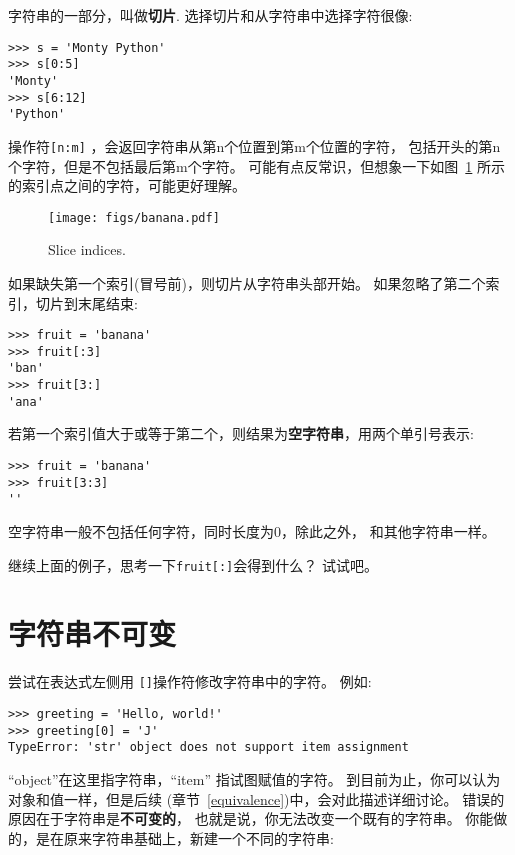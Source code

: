 \documentclass[10pt]{book}
\begin{document}
字符串的一部分，叫做{\bf 切片}.
选择切片和从字符串中选择字符很像:

\begin{verbatim}
>>> s = 'Monty Python'
>>> s[0:5]
'Monty'
>>> s[6:12]
'Python'
\end{verbatim}
%
操作符{\tt [n:m]} ，会返回字符串从第n个位置到第m个位置的字符，
包括开头的第n个字符，但是不包括最后第m个字符。
可能有点反常识，但想象一下如图~\ref{fig.banana} 所示
的索引点之间的字符，可能更好理解。

\begin{figure}
\centerline
{\texttt{[image: figs/banana.pdf]}}
\caption{Slice indices.}
\label{fig.banana}
\end{figure}
如果缺失第一个索引(冒号前)，则切片从字符串头部开始。
如果忽略了第二个索引，切片到末尾结束:

\begin{verbatim}
>>> fruit = 'banana'
>>> fruit[:3]
'ban'
>>> fruit[3:]
'ana'
\end{verbatim}
%
若第一个索引值大于或等于第二个，则结果为{\bf 空字符串}，用两个单引号表示:

\begin{verbatim}
>>> fruit = 'banana'
>>> fruit[3:3]
''
\end{verbatim}
%
空字符串一般不包括任何字符，同时长度为0，除此之外，
和其他字符串一样。

继续上面的例子，思考一下{\tt fruit[:]}会得到什么？
试试吧。



\section{字符串不可变}

尝试在表达式左侧用 {\tt []}操作符修改字符串中的字符。
例如:

\begin{verbatim}
>>> greeting = 'Hello, world!'
>>> greeting[0] = 'J'
TypeError: 'str' object does not support item assignment
\end{verbatim}
%
``object''在这里指字符串，``item'' 指试图赋值的字符。
到目前为止，你可以认为对象和值一样，但是后续
(章节~\ref{equivalence})中，会对此描述详细讨论。
错误的原因在于字符串是{\bf 不可变的}，
也就是说，你无法改变一个既有的字符串。
你能做的，是在原来字符串基础上，新建一个不同的字符串:
\end{document}
